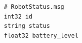\documentclass[preview,border=2pt]{standalone}
\begin{document}
\begin{lstlisting}[style=textstyle]
# RobotStatus.msg
int32 id
string status
float32 battery_level
\end{lstlisting}
\end{document}
